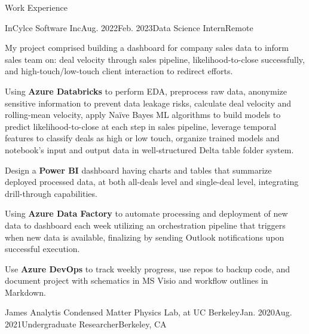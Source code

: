 \documentclass{resume}
\begin{document}

\begin{Section}{Work Experience}


\begin{workSection} {InCylce Software Inc}{Aug. 2022}{Feb. 2023}{Data Science Intern}{Remote}

\item My project comprised building a dashboard for company sales data to inform sales team on: deal velocity through sales pipeline, likelihood-to-close successfully, and high-touch/low-touch client interaction to redirect efforts. 
\item Using \textbf{Azure Databricks} to perform EDA, preprocess raw data, anonymize sensitive information to prevent data leakage risks, calculate deal velocity and rolling-mean velocity, apply Naïve Bayes ML algorithms to build models to predict likelihood-to-close at each step in sales pipeline, leverage temporal features to classify deals as high or low touch, organize trained models and notebook’s input and output data in well-structured Delta table folder system. 
\item Design a \textbf{Power BI} dashboard having charts and tables that summarize deployed processed data, at both all-deals level and single-deal level, integrating drill-through capabilities. 
\item Using \textbf{Azure Data Factory} to automate processing and deployment of new data to dashboard each week utilizing an orchestration pipeline that triggers when new data is available, finalizing by sending Outlook notifications upon successful execution.
\item Use \textbf{Azure DevOps} to track weekly progress, use repos to backup code, and document project with schematics in MS Visio and workflow outlines in Markdown.

\end{workSection}

\begin{workSection}{James Analytis Condensed Matter Physics Lab, at UC Berkeley}{Jan. 2020}{Aug. 2021}{Undergraduate Researcher}{Berkeley, CA}


\end{workSection}
\end{Section}
\end{document}
